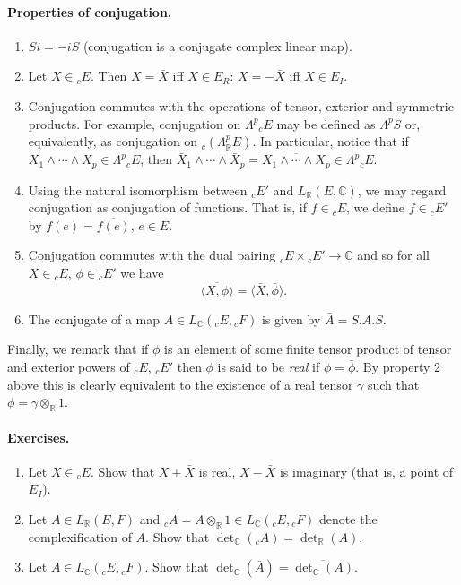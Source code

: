 \paragraph{Properties of conjugation.}
\begin{enumerate}
\item $Si=-iS$ (conjugation is a conjugate complex linear map).
\item Let $X\in{}_cE$. Then $X=\bar X$ iff $X\in E_R$: $X=-\bar X$ iff $X\in E_I$.
\item Conjugation commutes with the operations of tensor, exterior and symmetric products. For example, conjugation on $\Lambda^p{}_cE$ may be defined as $\Lambda^p S$ or, equivalently, as conjugation on ${}_c(\Lambda_{\mathbb R}^p E)$. In particular, notice that if $X_1\wedge\cdots\wedge X_p\in\Lambda^p{}_cE$, then $\bar X_1\wedge\cdots\wedge\bar X_p=\overline{X_1\wedge\cdots\wedge X_p}\in\Lambda^p{}_cE$.
\item Using the natural isomorphism between ${}_cE'$ and $L_{\mathbb R}(E,\mathbb C)$, we may regard conjugation as conjugation of functions. That is, if $f\in{}_cE$, we define $\bar f\in{}_cE'$ by $\bar f(e)=\overline{f(e)}$, $e\in E$.
\item Conjugation commutes with the dual pairing ${}_cE\times{}_cE'\to\mathbb C$ and so for all $X\in{}_cE$, $\phi\in{}_cE'$ we have
\[
\overline{\langle X,\phi\rangle}=\langle\bar X,\bar\phi\rangle.
\]
\item The conjugate of a map $A\in L_{\mathbb C}({}_cE,{}_cF)$ is given by $\bar A=S.A.S$.
\end{enumerate}
Finally, we remark that if $\phi$ is an element of some finite tensor product of tensor and exterior powers of ${}_cE$, ${}_cE'$ then $\phi$ is said to be \emph{real} if $\phi=\bar\phi$. By property 2 above this is clearly equivalent to the existence of a real tensor $\gamma$ such that $\phi=\gamma\otimes_{\mathbb R}1$.
\paragraph{Exercises.}
\begin{enumerate}
\item Let $X\in{}_cE$. Show that $X+\bar X$ is real, $X-\bar X$ is imaginary (that is, a point of $E_I$).
\item Let $A\in L_{\mathbb R}(E,F)$ and ${}_cA=A\otimes_{\mathbb R}1\in L_{\mathbb C}({}_cE,{}_cF)$ denote the complexification of $A$. Show that $\det_{\mathbb C}({}_cA)=\det_{\mathbb R}(A)$.
\item Let $A\in L_{\mathbb C}({}_cE,{}_cF)$. Show that $\det_{\mathbb C}(\bar A)=\overline{\det_{\mathbb C}(A)}$.
\end{enumerate}
